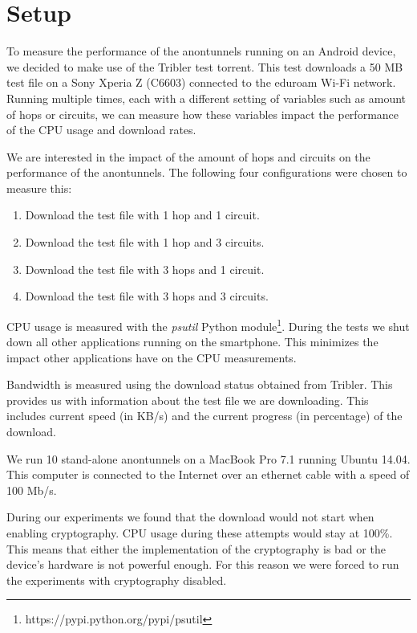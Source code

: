 % 
\section{Setup}
	\label{sec:experiments:approach}
	To measure the performance of the anontunnels running on an Android device, we decided to make use of the Tribler test torrent. This test downloads a 50 MB test file on a Sony Xperia Z (C6603)  connected to the eduroam Wi-Fi network. Running multiple times, each with a different setting of variables such as amount of hops or circuits, we can measure how these variables impact the performance of the CPU usage and download rates.
	
	We are interested in the impact of the amount of hops and circuits on the performance of the anontunnels. The following four configurations were chosen to measure this:
	
	\begin{enumerate}
		\item Download the test file with 1 hop and 1 circuit.
		\item Download the test file with 1 hop and 3 circuits.
		\item Download the test file with 3 hops and 1 circuit.
		\item Download the test file with 3 hops and 3 circuits.
	\end{enumerate}
	
	CPU usage is measured with the \emph{psutil} Python module\footnote{https://pypi.python.org/pypi/psutil}. During the tests we shut down all other applications running on the smartphone. This minimizes the impact other applications have on the CPU measurements.
	
	Bandwidth is measured using the download status obtained from Tribler. This provides us with information about the test file we are downloading. This includes current speed (in KB/s) and the current progress (in percentage) of the download.
	
	We run 10 stand-alone anontunnels on a MacBook Pro 7.1 running Ubuntu 14.04. This computer is connected to the Internet over an ethernet cable with a speed of 100 Mb/s. 
	
	During our experiments we found that the download would not start when enabling cryptography. CPU usage during these attempts would stay at 100\%. This means that either the implementation of the cryptography is bad or the device's hardware is not powerful enough. For this reason we were forced to run the experiments with cryptography disabled.
	
